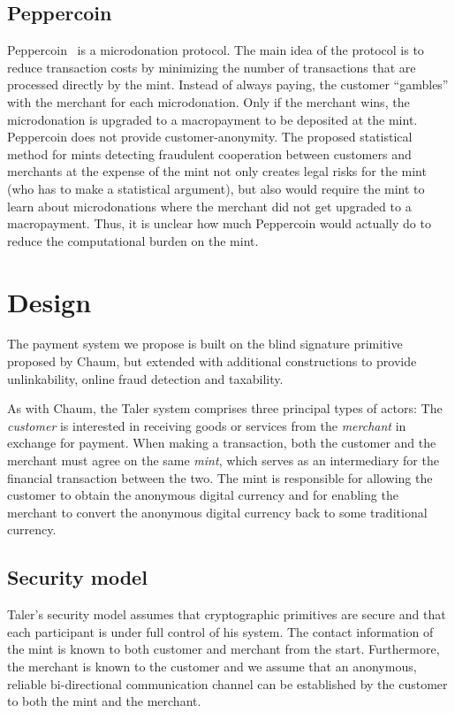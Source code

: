 \documentclass{llncs}
\begin{document}
\subsection{Peppercoin}

Peppercoin~\cite{rivest2004peppercoin} is a microdonation protocol.
The main idea of the protocol is to reduce transaction costs by
minimizing the number of transactions that are processed directly by
the mint.  Instead of always paying, the customer ``gambles'' with the
merchant for each microdonation.  Only if the merchant wins, the
microdonation is upgraded to a macropayment to be deposited at the
mint.  Peppercoin does not provide customer-anonymity.  The proposed
statistical method for mints detecting fraudulent cooperation between
customers and merchants at the expense of the mint not only creates
legal risks for the mint (who has to make a statistical argument), but
also would require the mint to learn about microdonations where the
merchant did not get upgraded to a macropayment.  Thus, it is unclear
how much Peppercoin would actually do to reduce the computational
burden on the mint.


\section{Design}

The payment system we propose is built on the blind signature
primitive proposed by Chaum, but extended with additional
constructions to provide unlinkability, online fraud detection and
taxability.

As with Chaum, the Taler system comprises three principal types of
actors: The \emph{customer} is interested in receiving goods or
services from the \emph{merchant} in exchange for payment.  When
making a transaction, both the customer and the merchant must agree on
the same \emph{mint}, which serves as an intermediary for the
financial transaction between the two.  The mint is responsible for
allowing the customer to obtain the anonymous digital currency and for
enabling the merchant to convert the anonymous digital currency back
to some traditional currency.

\subsection{Security model}

Taler's security model assumes that cryptographic primitives are
secure and that each participant is under full control of his system.
The contact information of the mint is known to both customer and
merchant from the start.  Furthermore, the merchant is known to the
customer and we assume that an anonymous, reliable bi-directional
communication channel can be established by the customer to both the
mint and the merchant.
\end{document}
